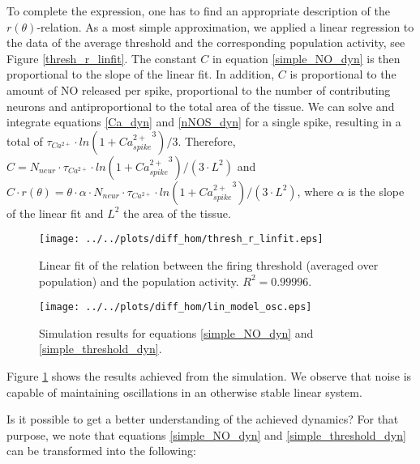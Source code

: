 \documentclass[10pt,a4paper]{article}
\begin{document}
To complete the expression, one has to find an appropriate description of the $r(\theta)$-relation. As a most simple approximation, we applied a linear regression to the data of the average threshold and the corresponding population activity, see Figure \ref{thresh_r_linfit}. The constant $C$ in equation \eqref{simple_NO_dyn} is then proportional to the slope of the linear fit. In addition, $C$ is proportional to the amount of NO released per spike, proportional to the number of contributing neurons and antiproportional to the total area of the tissue. We can solve and integrate equations \eqref{Ca_dyn} and \eqref{nNOS_dyn} for a single spike, resulting in a total of $\tau_{Ca^{2+}}\cdot ln(1+{Ca^{2+}_{spike}}^3) / 3$. Therefore, $C=N_{neur}\cdot \tau_{Ca^{2+}}\cdot ln(1+{Ca^{2+}_{spike}}^3) / (3\cdot L^2)$ and $C\cdot r(\theta)=\theta \cdot \alpha \cdot N_{neur} \cdot \tau_{Ca^{2+}}\cdot ln(1+{Ca^{2+}_{spike}}^3) / (3\cdot L^2)$, where $\alpha$ is the slope of the linear fit and $L^2$ the area of the tissue.
\begin{figure}
\texttt{[image: ../../plots/diff\_hom/thresh\_r\_linfit.eps]}
\caption{Linear fit of the relation between the firing threshold (averaged over population) and the population activity. $R^2=0.99996$.}

\end{figure}
\begin{figure}
\texttt{[image: ../../plots/diff\_hom/lin\_model\_osc.eps]}
\caption{Simulation results for equations \eqref{simple_NO_dyn} and \eqref{simple_threshold_dyn}.}
\label{lin_mod_osc}
\end{figure}
Figure \ref{lin_mod_osc} shows the results achieved from the simulation. We observe that noise is capable of maintaining oscillations in an otherwise stable linear system.

Is it possible to get a better understanding of the achieved dynamics? For that purpose, we note that equations \eqref{simple_NO_dyn} and \eqref{simple_threshold_dyn} can be transformed into the following:
\end{document}
